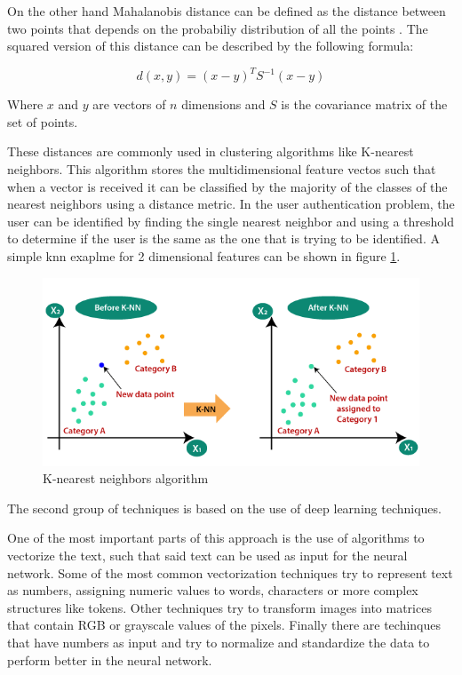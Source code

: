 On the other hand Mahalanobis distance can be defined as the distance between two points that depends on the probabiliy distribution of all the points \cite{de2000mahalanobis}. The squared version of this distance can be described by the following formula:

\begin{equation}
	d(x,y) = (x-y)^T S^{-1} (x-y)
\end{equation}

Where $x$ and $y$ are vectors of $n$ dimensions and $S$ is the covariance matrix of the set of points.


These distances are commonly used in clustering algorithms like K-nearest neighbors. This algorithm stores the multidimensional feature vectos such that when a vector is received it can be classified by the majority of the classes of the nearest neighbors using a distance metric. In the user authentication problem, the user can be identified by finding the single nearest neighbor and using a threshold to determine if the user is the same as the one that is trying to be identified. A simple knn exaplme for 2 dimensional features can be shown in figure \ref{fig:knn}.

\begin{figure}[h]
    \centering
    \includegraphics[width=0.7\linewidth]{images/knn}
    \caption{K-nearest neighbors algorithm \cite{knn}}
    \label{fig:knn}
\end{figure}

The second group of techniques is based on the use of deep learning techniques.

One of the most important parts of this approach is the use of algorithms to vectorize the text, such that said text can be used as input for the neural network. Some of the most common vectorization techniques try to represent text as numbers, assigning numeric values to words, characters or more complex structures like tokens. Other techniques try to transform images into matrices that contain RGB or grayscale values of the pixels. Finally there are techinques that have numbers as input and try to normalize and standardize the data to perform better in the neural network.

